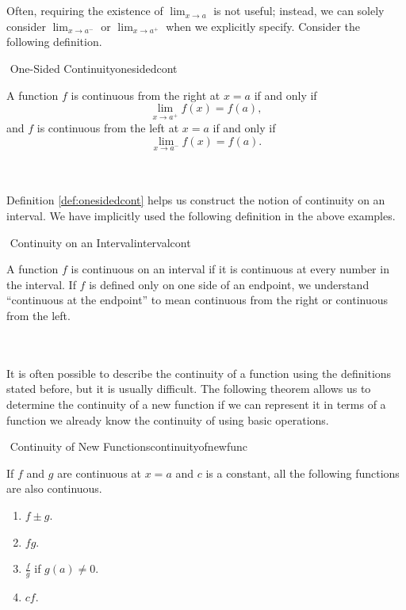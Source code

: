         \vphantom
        \\
        \\
        Often, requiring the existence of \(\lim_{x\to a}\) is not useful; instead, we can solely consider \(\lim_{x\to a^{-}}\) or \(\lim_{x\to a^{+}}\) when we explicitly specify. Consider the following definition.
        \begin{definition}{\Stop\,\,One-Sided Continuity}{onesidedcont}

            A function \(f\) is continuous from the right at \(x=a\) if and only if
            \begin{equation*}
                \lim_{x\to a^+}f(x)=f(a),
            \end{equation*}
            and \(f\) is continuous from the left at \(x=a\) if and only if
            \begin{equation*}
                \lim_{x\to a^-}f(x)=f(a).
            \end{equation*}
            
        \end{definition}
        \vphantom
        \\
        \\
        Definition \ref{def:onesidedcont} helps us construct the notion of continuity on an interval. We have implicitly used the following definition in the above examples.
        \begin{definition}{\Stop\,\,Continuity on an Interval}{intervalcont}

            A function \(f\) is continuous on an interval if it is continuous at every number in the interval. If \(f\) is defined only on one side of an endpoint, we understand ``continuous at the endpoint'' to mean continuous from the right or continuous from the left.
            
        \end{definition}
        \vphantom
        \\
        \\
        It is often possible to describe the continuity of a function using the definitions stated before, but it is usually difficult. The following theorem allows us to determine the continuity of a new function if we can represent it in terms of a function we already know the continuity of using basic operations.
        \begin{theorem}{\Stop\,\,Continuity of New Functions}{continuityofnewfunc}

            If \(f\) and \(g\) are continuous at \(x=a\) and \(c\) is a constant, all the following functions are also continuous.
            \begin{enumerate}
                \item \(f\pm g\).
                \item \(fg\).
                \item \(\frac{f}{g}\) if \(g(a)\neq0\).
                \item \(cf\).
            \end{enumerate}
            
        \end{theorem}
